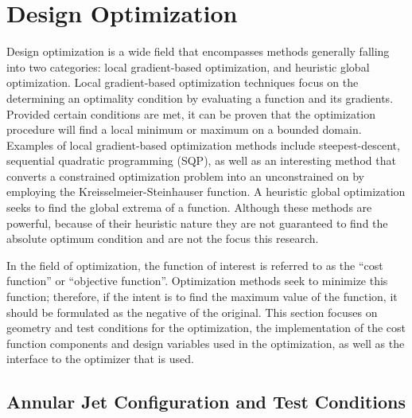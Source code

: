 \chapter{Design Optimization}
\label{chapter-five}

Design optimization is a wide field that encompasses methods generally falling
into two categories: local gradient-based optimization, and heuristic global
optimization.  Local gradient-based optimization techniques focus on the
determining an optimality condition by evaluating a function and its gradients.
Provided certain conditions are met, it can be proven that the optimization
procedure will find a local minimum or maximum on a bounded domain.  Examples of
local gradient-based optimization methods include
steepest-descent\cite{fletcher1963rapidly}, sequential quadratic programming
(SQP)\cite{SNOPT-alg}, as well as an interesting method that converts a
constrained optimization problem into an unconstrained on by employing the
Kreisselmeier-Steinhauser function\cite{wrenn1989indirect}.  A heuristic global
optimization seeks to find the global extrema of a function.  Although these
methods are powerful, because of their heuristic nature they are not guaranteed
to find the absolute optimum condition and are not the focus this research.

In the field of optimization, the function of interest is referred to as the
``cost function'' or ``objective function''.  Optimization methods seek to
minimize this function; therefore, if the intent is to find the maximum value
of the function, it should be formulated as the negative of the original.  This
section focuses on geometry and test conditions for the optimization, the
implementation of the cost function components and design variables used in the
optimization, as well as the interface to the optimizer that is used.

\section{Annular Jet Configuration and Test Conditions}

